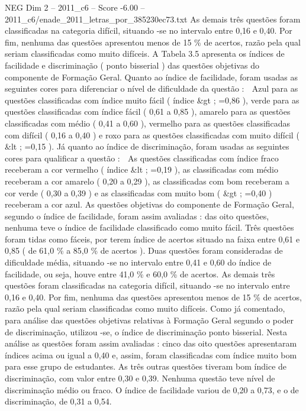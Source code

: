 \begin{textsample}{NEG Dim 2 – 2011\_c6 – Score -6.00 – 2011\_c6/enade\_2011\_letras\_por\_385230ec73.txt}
As demais três questões foram classificadas na categoria difícil, situando -se no intervalo entre 0,16 e 0,40.
Por fim, nenhuma das questões apresentou menos de 15 \% de acertos, razão pela qual seriam classificadas como muito difíceis.
A Tabela 3.5 apresenta os índices de facilidade e discriminação ( ponto bisserial ) das questões objetivas do componente de Formação Geral.
Quanto ao índice de facilidade, foram usadas as seguintes cores para diferenciar o nível de dificuldade da questão :  Azul para as questões classificadas com índice muito fácil ( índice \&gt ; =0,86 ), verde para as questões classificadas com índice fácil ( 0,61 a 0,85 ), amarelo para as questões classificadas com médio ( 0,41 a 0,60 ), vermelho para as questões classificadas com difícil ( 0,16 a 0,40 ) e roxo para as questões classificadas com muito difícil ( \&lt ; =0,15 ).
Já quanto ao índice de discriminação, foram usadas as seguintes cores para qualificar a questão :  As questões classificadas com índice fraco receberam a cor vermelho ( índice \&lt ; =0,19 ), as classificadas com médio receberam a cor amarelo ( 0,20 a 0,29 ), as classificadas com bom receberam a cor verde ( 0,30 a 0,39 ) e as classificadas com muito bom ( \&gt ; =0,40 ) receberam a cor azul.
As questões objetivas do componente de Formação Geral, segundo o índice de facilidade, foram assim avaliadas : das oito questões, nenhuma teve o índice de facilidade classificado como muito fácil.
Três questões foram tidas como fáceis, por terem índice de acertos situado na faixa entre 0,61 e 0,85 ( de 61,0 \% a 85,0 \% de acertos ).
Duas questões foram consideradas de dificuldade média, situando -se no intervalo entre 0,41 e 0,60 do índice de facilidade, ou seja, houve entre 41,0 \% e 60,0 \% de acertos.
As demais três questões foram classificadas na categoria difícil, situando -se no intervalo entre 0,16 e 0,40.
Por fim, nenhuma das questões apresentou menos de 15 \% de acertos, razão pela qual seriam classificadas como muito difíceis.
Como já comentado, para análise das questões objetivas relativas à Formação Geral segundo o poder de discriminação, utilizou -se, o índice de discriminação ponto bisserial.
Nesta análise as questões foram assim avaliadas : cinco das oito questões apresentaram índices acima ou igual a 0,40 e, assim, foram classificadas com índice muito bom para esse grupo de estudantes.
As três outras questões tiveram bom índice de discriminação, com valor entre 0,30 e 0,39.
Nenhuma questão teve nível de discriminação médio ou fraco.
O índice de facilidade variou de 0,20 a 0,73, e o de discriminação, de 0,31 a 0,54.

\end{textsample}
